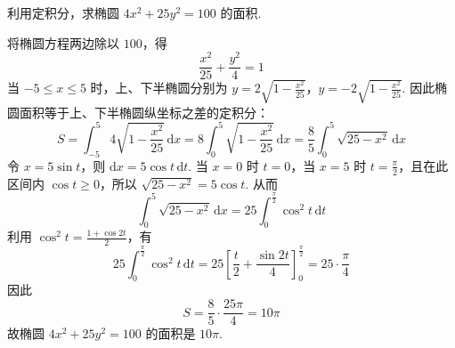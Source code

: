 \begin{problem}
利用定积分，求椭圆 \(4x^2+25y^2=100\) 的面积.
\end{problem}

\begin{solution}
将椭圆方程两边除以 \(100\)，得
\[
\frac{x^2}{25}+\frac{y^2}{4}=1
\]
当 \(-5\leq x\leq5\) 时，上、下半椭圆分别为
\(y=2\sqrt{1-\frac{x^2}{25}}\)，\(y=-2\sqrt{1-\frac{x^2}{25}}\).
因此椭圆面积等于上、下半椭圆纵坐标之差的定积分：
\[
S=\int_{-5}^{5}4\sqrt{1-\frac{x^2}{25}}\,\mathrm{d}x
=8\int_0^5\sqrt{1-\frac{x^2}{25}}\,\mathrm{d}x
=\frac85\int_0^5\sqrt{25-x^2}\,\mathrm{d}x
\]
令 \(x=5\sin t\)，则 \(\mathrm{d}x=5\cos t\,\mathrm{d}t\). 当 \(x=0\) 时 \(t=0\)，当 \(x=5\) 时 \(t=\frac\pi2\)，且在此区间内 \(\cos t\geq0\)，所以 \(\sqrt{25-x^2}=5\cos t\). 从而
\[
\int_0^5\sqrt{25-x^2}\,\mathrm{d}x
=25\int_0^{\frac\pi2}\cos^2t\,\mathrm{d}t
\]
利用 \(\cos^2t=\frac{1+\cos2t}{2}\)，有
\[
25\int_0^{\frac\pi2}\cos^2t\,\mathrm{d}t
=25\left[\frac t2+\frac{\sin2t}{4}\right]_0^{\frac\pi2}
=25\cdot\frac\pi4
\]
因此
\[
S=\frac85\cdot\frac{25\pi}{4}=10\pi
\]
故椭圆 \(4x^2+25y^2=100\) 的面积是 \(10\pi\).
\end{solution}
